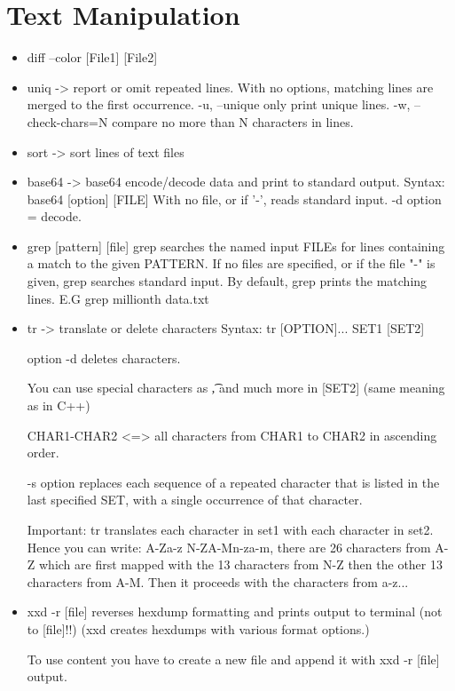 \documentclass[a4paper]{report}
\begin{document}
\section{Text Manipulation}
\begin{itemize}
\item diff --color [File1] [File2]

\item uniq -> report or omit repeated lines. 
		 With no options, matching lines are merged to the first occurrence. 
		 -u, --unique only print unique lines. 
		 -w, --check-chars=N compare no more than N characters in lines. 
		 
\item sort -> sort lines of text files

\item base64 -> base64 encode/decode data and print to standard output. 
		 Syntax: base64 [option] [FILE]
	 	 With no file, or if '-', reads standard input. 
	 	 -d option = decode.
	 	 
\item grep [pattern] [file] grep searches the named input FILEs 
		 for lines containing a match to the given PATTERN. 
		 If no files are specified, or if the file "-" is given, 
		 grep  searches  standard input. By default, grep prints the matching lines. 
		 E.G grep millionth data.txt
		 
		 
\item tr -> translate or delete characters 
		 Syntax: tr [OPTION]... SET1 [SET2]
		 
		 option -d deletes characters.
		 
		 You can use special characters as \t, \n 
		 and much more in [SET2] (same meaning as in C++)
		 
		 CHAR1-CHAR2 <=> all characters from CHAR1 to CHAR2 in 
		 ascending order. 
		 
		 -s option replaces each sequence of a repeated character 
		 that is listed  in the last specified SET, 
		 with a single occurrence of that character.

	 Important: tr translates each character in set1 with each 
	 character in set2. Hence you can write: A-Za-z N-ZA-Mn-za-m,
	 there are 26 characters from A-Z which are first mapped with 
	 the 13 characters from N-Z then the other 13 characters from A-M.
	 Then it proceeds with the characters from a-z...
	 
\item xxd -r [file] reverses hexdump formatting and prints output 
		 to terminal (not to [file]!!) (xxd creates hexdumps with 
		 various format options.)
	 
	 	 To use content you have to create a new file and append it 
	 	 with xxd -r [file] output. 
\end{itemize}
\end{document}
